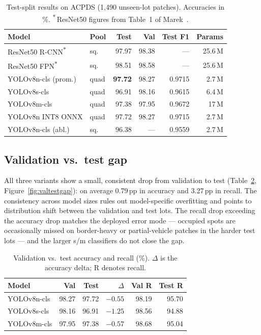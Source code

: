 \documentclass[10pt,twocolumn,letterpaper]{article}
\begin{document}
\begin{table}[tp]
\centering\footnotesize
\setlength{\tabcolsep}{4pt}
\begin{tabular}{llrrrr}
\toprule
\textbf{Model} & \textbf{Pool} & \textbf{Test} & \textbf{Val} &
\textbf{Test F1} & \textbf{Params} \\
\midrule
ResNet50 R-CNN\textsuperscript{$\ast$} & sq. & 97.97 & 98.38 & --- & 25.6\,M \\
ResNet50 FPN\textsuperscript{$\ast$} & sq. & 98.51 & 98.58 & --- & 25.6\,M \\
\midrule
YOLOv8n-cls (prom.) & quad & \textbf{97.72} & 98.27 & 0.9715 & 2.7\,M \\
YOLOv8s-cls & quad & 96.91 & 98.16 & 0.9615 & 6.4\,M \\
YOLOv8m-cls & quad & 97.38 & 97.95 & 0.9672 & 17\,M \\
YOLOv8n INT8 ONNX & quad & 97.72 & 98.27 & 0.9715 & 2.7\,M \\
YOLOv8n-cls (abl.) & sq. & 96.38 & --- & 0.9559 & 2.7\,M \\
\bottomrule
\end{tabular}
\caption{Test-split results on ACPDS (1{,}490 unseen-lot patches).
Accuracies in \%. \textsuperscript{$\ast$}\,ResNet50 figures from
Table~1 of Marek~\cite{marek2021imagebased}.}
\label{tab:testcompare}
\end{table}

\subsection{Validation vs.\ test gap}

All three variants show a small, consistent drop from validation to test
(Table~\ref{tab:valtestgap}, Figure~\ref{fig:valtestgap}): on average
0.79\,pp in accuracy and 3.27\,pp in recall. The consistency across model
sizes rules out model-specific overfitting and points to distribution
shift between the validation and test lots. The recall drop exceeding the
accuracy drop matches the deployed error mode --- occupied spots are
occasionally missed on border-heavy or partial-vehicle patches in the
harder test lots --- and the larger s/m classifiers do not close the gap.

\begin{table}[tp]
\centering\small
\setlength{\tabcolsep}{4pt}
\begin{tabular}{lrrrrr}
\toprule
\textbf{Model} & \textbf{Val} & \textbf{Test} & \textbf{$\Delta$} &
\textbf{Val R} & \textbf{Test R} \\
\midrule
YOLOv8n-cls & 98.27 & 97.72 & $-0.55$ & 98.19 & 95.70 \\
YOLOv8s-cls & 98.16 & 96.91 & $-1.25$ & 98.56 & 94.88 \\
YOLOv8m-cls & 97.95 & 97.38 & $-0.57$ & 98.68 & 95.04 \\
\bottomrule
\end{tabular}
\caption{Validation vs.\ test accuracy and recall (\%). $\Delta$ is the
accuracy delta; R denotes recall.}
\label{tab:valtestgap}
\end{table}
\end{document}
